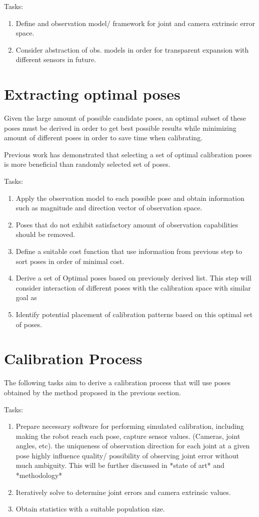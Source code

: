 \documentclass[english, printversion, nomenclature, notitle]{tuvisionthesis} %
\makeatletter
\renewcommand{\todo}[2][]{\tikzexternaldisable\@todo[#1]{#2}\tikzexternalenable}
\makeatother
\begin{document}
Tasks:
\begin{enumerate}
	\item Define and observation model/ framework for joint and camera extrinsic error space.
	\item Consider abstraction of obs. models in order for transparent expansion with different sensors in future.
\end{enumerate}

\section{Extracting optimal poses}
Given the large amount of possible candidate poses, an optimal subset of these poses must be derived in order to get best possible results while minimizing amount of different poses in order to save time when calibrating.

Previous work has demonstrated that selecting a set of optimal calibration poses is more beneficial than randomly selected set of poses.

Tasks:
\begin{enumerate}
	\item Apply the observation model to each possible pose and obtain information such as magnitude and direction vector of observation space.
	\item Poses that do not exhibit satisfactory amount of observation capabilities should be removed.
	\item Define a suitable cost function that use information from previous step to sort poses in order of minimal cost.
	\item Derive a set of Optimal poses based on previously derived list. This step will consider interaction of different poses with the calibration space with similar goal as  \todo{cite paper about condition number?}
	\item Identify potential placement of calibration patterns based on this optimal set of poses.
\end{enumerate}

\section{Calibration Process}
The following tasks aim to derive a calibration process that will use poses obtained by the method proposed in the previous section.

Tasks:
\begin{enumerate}
	\item Prepare necessary software for performing simulated calibration, including making the robot reach each pose, capture sensor values. (Cameras, joint angles, etc).
	\subitem the uniqueness of observation direction for each joint at a given pose highly influence quality/ possibility of observing joint error without much ambiguity. This will be further discussed in *state of art* and *methodology*
	\item Iteratively solve to determine joint errors and camera extrinsic values.
	\item Obtain statistics with a suitable population size.
\end{enumerate}
\end{document}
